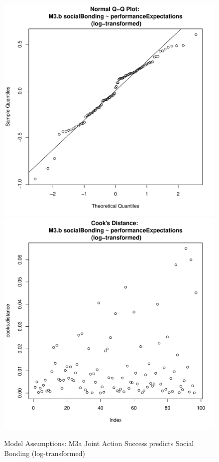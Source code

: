 \documentclass[12pt]{report}
\begin{document}
{\begin{figure}[htbp]
  \includegraphics[scale =.4]{../images/MLM3bLogQQNorm.pdf}
  \includegraphics[scale =.4]{../images/MLM3bLogCooksD.pdf}
  \caption{Model Assumptions: M3a Joint Action Success predicts Social Bonding (log-transformed)}
  \label{fig:MLM3bLogAssumptions}
\end{figure}





}
\end{document}
